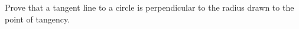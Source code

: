 Prove that a tangent line to a circle is perpendicular to the radius drawn to the point of tangency.
